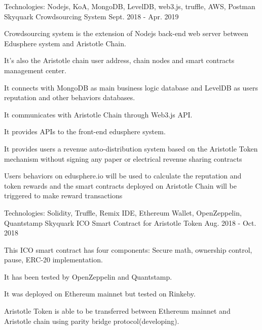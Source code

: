 \begin{cventries}
\cventry
    {Technologies: \quad Nodejs, KoA, MongoDB, LevelDB, web3.js, truffle, AWS, Postman
    }
    {Skyquark Crowdsourcing System}
    {}
    {Sept. 2018 - Apr. 2019}
    {
      \begin{cvitems}
        \item {Crowdsourcing system is the extension of Nodejs back-end web server between Edusphere system and Aristotle Chain.}
        \item {It's also the Aristotle chain user address, chain nodes and smart contracts   management center.}
        \item {It connects with MongoDB as main business logic database and LevelDB as users reputation and other behaviors databases.}
        \item {It communicates with Aristotle Chain through Web3.js API.}
        \item {It provides APIs to the front-end edusphere system.}
        \item {It provides users a revenue auto-distribution system based on the Aristotle Token mechanism without signing any paper or electrical revenue sharing contracts}
        \item {Users behaviors on edusphere.io will be used to calculate the reputation and token rewards and the smart contracts deployed on Aristotle Chain will be triggered to make reward transactions}
      \end{cvitems}
    }

  \cventry
    {Technologies: \quad Solidity, Truffle, Remix IDE, Ethereum Wallet, OpenZeppelin, Quantstamp
    }
    {Skyquark ICO Smart Contract for Aristotle Token}
    {}
    {Aug. 2018 - Oct. 2018}
    {
      \begin{cvitems} 
        \item {This ICO smart contract has four components: Secure math, ownership control, pause, ERC-20 implementation.}
        \item {It has been tested by OpenZeppelin and Quantstamp.}
        \item {It was deployed on Ethereum mainnet but tested on Rinkeby.}
        \item {Aristotle Token is able to be transferred between Ethereum mainnet and Aristotle chain using parity bridge protocol(developing).}
      \end{cvitems}
    }


\end{cventries}
